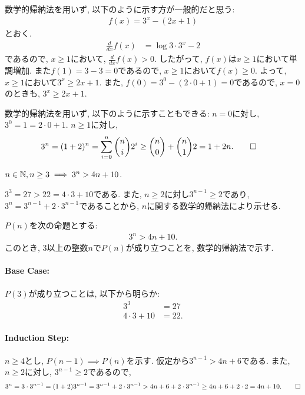 \begin{rem}
  数学的帰納法を用いず, 以下のように示す方が一般的だと思う:
  \begin{align*}
    f(x)=3^x-(2x+1)
  \end{align*}
  とおく.
  \begin{align*}
    \frac{d}{dx}f(x)&=\log 3 \cdot 3^x-2
  \end{align*}
  であるので,
  $x\geq 1$において,
  $\frac{d}{dx}f(x)> 0$.
  したがって, $f(x)$は$x\geq 1$において単調増加.
  また$f(1)=3-3=0$であるので,
  $x\geq 1$において$f(x) \geq 0$.
  よって, $x\geq 1$において$3^x \geq 2x+1$.
  また, $f(0)=3^0-(2\cdot0+1)=0$であるので, $x=0$のときも,
  $3^x\geq 2x+1$.
\end{rem}
\begin{rem}
  数学的帰納法を用いず, 以下のように示すこともできる:
  $n=0$に対し, $3^0=1=2\cdot0+1$.
  $n\geq 1$に対し, 
  \begin{align*}
    3^n=(1+2)^n=\sum_{i=0}^n \binom{n}{i}2^i
    &\geq \binom{n}{0}+\binom{n}{1}2
    =1+2n
    .\qedhere
  \end{align*}
\end{rem}

\begin{prop}
  \label{p:20230820}
  $n\in\mathbb{N},n\geq 3\implies 3^n> 4n+10$.
\end{prop}
\begin{proof**}
  $3^{3}=27>22= 4\cdot 3+10$である.
  また, 
  $n\geq 2$に対し$3^{n-1}\geq 2$であり,
  $3^n=3^{n-1}+2\cdot 3^{n-1}$であることから,
  $n$に関する数学的帰納法により示せる.
\end{proof**}
\begin{proof*}
  $P(n)$を次の命題とする:
  \begin{align*}
    3^n> 4n+10
    .
  \end{align*}
  このとき,
  $3$以上の整数$n$で$P(n)$が成り立つことを,
  数学的帰納法で示す.

  \paragraph{Base Case:}
  $P(3)$が成り立つことは, 以下から明らか:
  \begin{align*}
    3^{3}&=27\\
     4\cdot 3+10&=22.
  \end{align*}
  \paragraph{Induction Step:}
  $n\geq 4$とし,
  $P(n-1)\implies P(n)$を示す.
  仮定から$3^{n-1}> 4n+6$である.
  また, 
  $n\geq 2$に対し, $3^{n-1}\geq 2$であるので,
  \begin{align*}
    3^n=3\cdot 3^{n-1}=(1+2)3^{n-1}=3^{n-1}+2\cdot 3^{n-1}> 4n+6+2\cdot 3^{n-1}\geq 4n+6+2\cdot 2=4n+10
    .\qedhere
  \end{align*}
\end{proof*}

